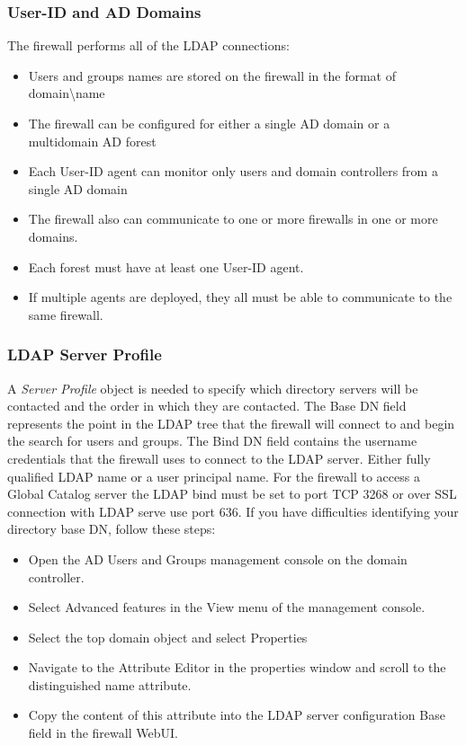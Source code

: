 \subsubsection{User-ID and AD Domains}
The firewall performs all of the LDAP connections:
\begin{itemize}
    \item Users and groups names are stored on the firewall in the format of domain\textbackslash name
    \item The firewall can be configured for either a single AD domain or a multidomain AD forest
    \item Each User-ID agent can monitor only users and domain controllers from a single AD domain
    \item The firewall also can communicate to one or more firewalls in one or more domains.
    \item Each forest must have at least one User-ID agent.
    \item If multiple agents are deployed, they all must be able to communicate to the same firewall.
\end{itemize}

\subsubsection{LDAP Server Profile}
A \textit{Server Profile} object is needed to specify which directory servers will be contacted and the order in which they are contacted.
The Base DN field represents the point in the LDAP tree that the firewall will connect to and begin the search for users and groups.
The Bind DN field contains the username credentials that the firewall uses to connect to the LDAP server. Either fully qualified LDAP name or a user principal name.
For the firewall to access a Global Catalog server the LDAP bind must be set to port TCP 3268 or over SSL connection with LDAP serve use port 636.
If you have difficulties identifying your directory base DN, follow these steps:
\begin{itemize}
    \item Open the AD Users and Groups management console on the domain controller.
    \item Select Advanced features in the View menu of the management console.
    \item Select the top domain object and select Properties
    \item Navigate to the Attribute Editor in the properties window and scroll to the distinguished name attribute.
    \item Copy the content of this attribute into the LDAP server configuration Base field in the firewall WebUI.
\end{itemize}

